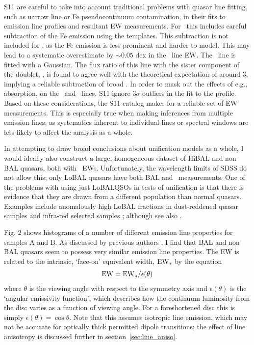 S11 are careful to take into account traditional problems with quasar line fitting,
such as narrow line or Fe pseudocontinuum contamination, in their fits to 
emission line profiles and resultant EW measurements. For \mgline\
this includes careful subtraction of the Fe emission using the \cite{vestergaard2001}
templates. This subtraction is not included for \civfull,
as the Fe emission is less prominent and harder to model. This may lead to
a systematic overestimate by $\sim0.05$ dex in the \civ\ line EW. 
The \oiiifull\ line is fitted with a Gaussian. The flux ratio of this line 
with the sister component of the doublet, \oiiidoublet, is found to agree well 
with the theoretical expectation of around 3, implying a reliable subtraction of broad \hb.
In order to mask out the effects of e.g., absorption, on the \civ\ and \mg\ lines, 
S11 ignore $3\sigma$ outliers in the fit to the profile. Based on these
considerations, the S11 catalog makes for a reliable set of EW 
measurements. This is especially true when making inferences from 
multiple emission lines, as systematics inherent to individual lines 
or spectral windows are less likely to affect the analysis as a whole.

In attempting to draw broad conclusions about unification models as a whole,
I would ideally also construct a large, homogeneous dataset of 
HiBAL and non-BAL quasars, both with \oiiifull\ EWs. Unfortunately,
the wavelength limits of SDSS do not allow this; only LoBAL quasars have 
both BAL and \ewo\ measurements. One of the problems with
using just LoBALQSOs in tests of unification is that there is evidence 
that they are drawn from a different population than normal quasars. 
Examples include anomalously 
high LoBAL fractions in dust-reddened quasar samples \citep{urrutia2009} 
and infra-red selected samples \citep{dai2012}; 
although see also \cite{lazarova2012}.

Fig. 2 shows histograms of a number of different 
emission line properties for samples A and B. 
As discussed by previous authors \cite[e.g.][]{weymann1991}, I find that BAL
and non-BAL quasars seem to possess very similar emission line 
properties. The EW is related to the intrinsic, `face-on' equivalent width,
${\rm EW}_*$ by the equation
\begin{equation}
{\rm EW} = {\rm EW}_* /\epsilon(\theta)
\end{equation}
where $\theta$ is the viewing angle with respect to the symmetry axis 
and $\epsilon(\theta)$ is the `angular emissivity function', which describes 
how the continuum luminosity from the disc varies as a function of viewing angle.
For a foreshortened disc this is simply $\epsilon(\theta) = \cos \theta$. 
Note that this assumes isotropic line emission, which may not be accurate for optically thick
permitted dipole transitions; the effect of line anisotropy is discussed further 
in section~\ref{sec:line_aniso}. 


